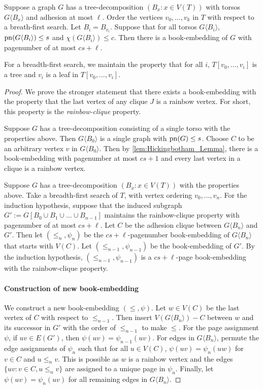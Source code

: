 \begin{theorem}
	Suppose a graph \(G\) has a tree-decomposition \((B_x: x \in V(T))\) with torsos \(G \langle B_x \rangle\) and adhesion at most \(\ell\). Order the vertices \(v_0, \ldots, v_k\) in $T$ with respect to a breath-first search. Let $B_i = B_{v_i}$. Suppose that for all torsos $G\langle B_i \rangle$, \(\operatorname{pn}(G\langle B_i \rangle) \leq s\) and \(\chi(G\langle B_i \rangle) \leq c\). Then there is a book-embedding of \(G\) with pagenumber of at most \(cs + \ell\).
\end{theorem}
For a breadth-first search, we maintain the property that for all \(i\), \(T[v_0, \ldots, v_{i}]\) is a tree and \(v_i\) is a leaf in \(T[v_0, \ldots, v_{i}]\).
\begin{proof}
	We prove the stronger statement that there exists a book-embedding with the property that the last vertex of any clique \(J\) is a rainbow vertex. For short, this property is the \textit{rainbow-clique} property. 

	Suppose $G$ has a tree-decomposition consisting of a single torso with the properties above. Then \(G\langle B_0 \rangle\) is a single graph with \(\operatorname{pn}(G) \leq s\). Choose \(C\) to be an arbitrary vertex \(v\) in \(G\langle B_0 \rangle\). Then by \cref{lem:Hickingbotham_Lemma}, there is a book-embedding with pagenumber at most \(cs + 1\) and every last vertex in a clique is a rainbow vertex.

	Suppose $G$ has a tree-decomposition $(B_x: x \in V(T))$ with the properties above. Take a breadth-first search of $T$, with vertex ordering $v_0, \ldots, v_n$. For the induction hypothesis, suppose that the induced subgraph $G' := G[B_0 \cup B_1 \cup \ldots \cup B_{n-1}]$ maintains the rainbow-clique property with pagenumber of at most \(cs + \ell\).  
	Let \(C\) be the adhesion clique between \(G \langle B_n \rangle\) and $G'$. Then let \((\leq_n, \psi_n)\) be the \(cs + \ell\)-pagenumber book-embedding of \(G \langle B_n \rangle\) that starts with \(V(C)\). Let \((\leq_{n-1}, \psi_{n-1})\) be the book-embedding of \(G'\). By the induction hypothesis, \((\leq_{n-1}, \psi_{n-1})\) is a \(cs + \ell\)-page book-embedding with the rainbow-clique property.

	\paragraph{Construction of new book-embedding}
	We construct a new book-embedding \((\leq, \psi)\).
	Let \(w \in V(C)\) be the last vertex of \(C\) with respect to \(\leq_{n-1}\). Then insert \(V(G \langle B_n \rangle) - C\) between \(w\) and its successor in $G'$ with the order of \(\leq_{n-1}\) to make $\leq$. For the page assignment \(\psi\), if \(uv \in E(G')\), then \(\psi(uv) = \psi_{n-1}(uv)\). For edges in $G \langle B_n \rangle$, permute the edge assignments of \(\psi_n\) such that for all \(u \in V(C)\), \(\psi(uv) = \psi_n(uw)\) for $v \in C$ and $u \leq_n v$. This is possible as \(w\) is a rainbow vertex and the edges \(\{uv : v \in C, u \leq_n v\}\) are assigned to a unique page in \(\psi_n\). Finally, let \(\psi(uv) = \psi_n(uv)\) for all remaining edges in $G \langle B_n \rangle$. 

\end{proof}
